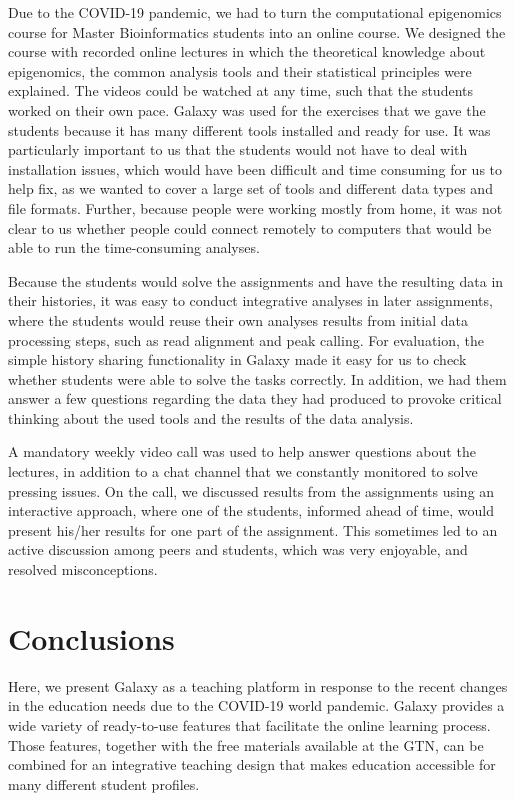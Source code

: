 Due to the COVID-19 pandemic, we had to turn the computational epigenomics course for Master Bioinformatics students into an online course. We designed the course with recorded online lectures in which the theoretical knowledge about epigenomics, the common analysis tools and their statistical principles were explained. The videos could be watched at any time, such that the students worked on their own pace. Galaxy was used for the exercises that we gave the students because it has many different tools installed and ready for use. It was particularly important to us that the students would not have to deal with installation issues, which would have been difficult and time consuming for us to help fix, as we wanted to cover a large set of tools and different data types and file formats. Further, because people were working mostly from home, it was not clear to us whether people could connect remotely to computers that would be able to run the time-consuming analyses.

Because the students would solve the assignments and have the resulting data in their histories, it was easy to conduct integrative analyses in later assignments, where the students would reuse their own analyses results from initial data processing steps, such as read alignment and peak calling. For evaluation, the simple history sharing functionality in Galaxy made it easy for us to check whether students were able to solve the tasks correctly. In addition, we had them answer a few questions regarding the data they had produced to provoke critical thinking about the used tools and the results of the data analysis.

A mandatory weekly video call was used to help answer questions about the lectures, in addition to a chat channel that we constantly monitored to solve pressing issues. On the call, we discussed results from the assignments using an interactive approach, where one of the students, informed ahead of time, would present his/her results for one part of the assignment. This sometimes led to an active discussion among peers and students, which was very enjoyable, and resolved misconceptions.


\section*{Conclusions}

Here, we present Galaxy as a teaching platform in response to the recent changes in the education needs due to the COVID-19 world pandemic. Galaxy provides a wide variety of ready-to-use features that facilitate the online learning process. Those features, together with the free materials available at the GTN, can be combined for an integrative teaching design that makes education accessible for many different student profiles.

